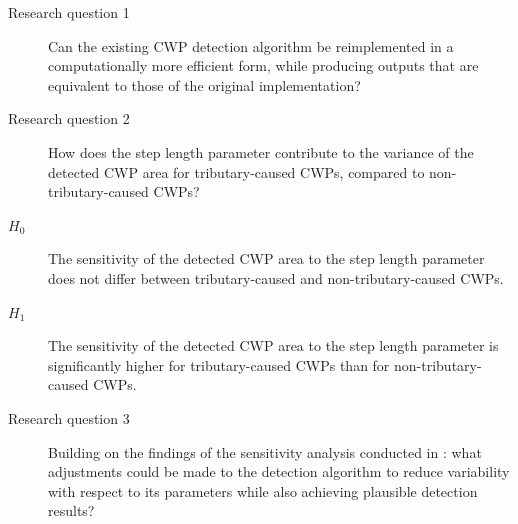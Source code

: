 \begin{description}
	\item[Research question 1] Can the existing CWP detection algorithm be 
	reimplemented in a computationally more efficient form, while producing 
	outputs that are equivalent to those of the original implementation?
	\item[Research question 2] How does the step length parameter contribute 
	to the variance of the detected CWP area for tributary-caused CWPs, 
	compared to non-tributary-caused CWPs?
	\item[$H_0$] The sensitivity of the detected CWP area to the step length 
	parameter does not differ between tributary-caused and non-tributary-caused 
	CWPs.
	\item[$H_1$] The sensitivity of the detected CWP area to the step length 
	parameter is significantly higher for tributary-caused CWPs than for 
	non-tributary-caused CWPs.
	\item[Research question 3] Building on the findings of the sensitivity 
	analysis conducted in \citet{tonolla_thermische-kartographie_2026}: what 
	adjustments could be made to the detection algorithm to reduce variability 
	with respect to its parameters while also achieving plausible detection 
	results?
\end{description}